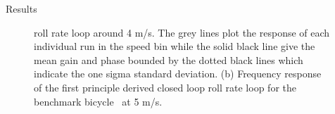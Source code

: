 \documentclass[final]{beamer}
\newlength{\onecolwid}
\begin{document}
{\begin{center}
\begin{columns}[t]
\begin{column}{\onecolwid}
\begin{block}{Results}
\begin{figure}[h]
\begin{center}
{{          roll rate loop around 4 m/s. The grey lines plot the response of each
          individual run in the speed bin while the solid black line give the
          mean gain and phase bounded by the dotted black lines which indicate
          the one sigma standard deviation. (b) Frequency response of the first
          principle derived closed loop roll rate loop for the benchmark
          bicycle~\cite{Meijaard2007} at 5 m/s.}}
      \label{fig:neuro-compare}
      \end{center}
    \end{figure}


    \begin{figure}[h]
      \begin{center}


\end{center}
\end{figure}
\end{block}
\end{column}
\end{columns}
\end{center}}
\end{document}

